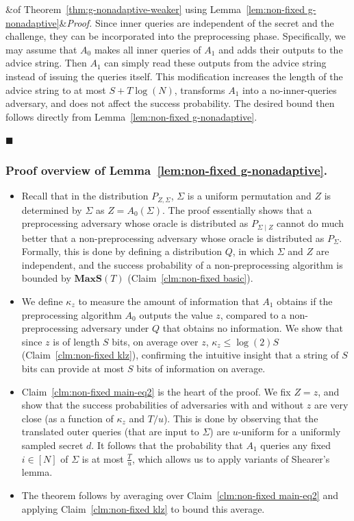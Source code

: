 \documentclass[11pt]{article}
\renewenvironment{proof}[1][]
    {\noindent
       \ifx&#1&{\it Proof.}
       \else{\it Proof ({#1}).}
       \fi}{\hfill $\blacksquare$}
\newcommand{\secv}{{d}}
\newcommand{\MAXS}{\boldsymbol{MaxS}}
\begin{document}
\begin{proof}[of Theorem~\ref{thm:g-nonadaptive-weaker} using Lemma~\ref{lem:non-fixed g-nonadaptive}] Since inner queries are independent of the secret and the challenge, they can be incorporated into the preprocessing phase. Specifically, we may assume that $A_0$ makes all inner queries of $A_1$ and adds their outputs to the advice string. Then $A_1$ can simply read these outputs from the advice string instead of issuing the queries itself. This modification increases the length of the advice string to at most $S + T \log(N)$, transforms $A_1$ into a no-inner-queries adversary, and does not affect the success probability. The desired bound then follows directly from Lemma~\ref{lem:non-fixed g-nonadaptive}.

\end{proof}

\subsubsection{Proof overview of Lemma~\ref{lem:non-fixed g-nonadaptive}.}
\label{subsec:proof overview of weaker}

\begin{itemize}
    \item Recall that in the distribution $P_{Z,\Sigma}$, $\Sigma$ is a uniform permutation and $Z$ is determined by $\Sigma$ as 
    $Z=A_0(\Sigma)$.
    The proof essentially shows that a preprocessing adversary whose oracle is distributed as $P_{\Sigma \mid Z}$ cannot do much better that a non-preprocessing adversary whose oracle is distributed as $P_{\Sigma}$. Formally, this is done by defining a distribution $Q$, in which $\Sigma$ and $Z$ are independent, and the success probability of a non-preprocessing algorithm is bounded by $\MAXS(T)$ (Claim~\ref{clm:non-fixed basic}). 
    \item We define $\kappa_z$ to measure the amount of information that $A_1$ obtains if the preprocessing algorithm $A_0$ outputs the value $z$, compared to a non-preprocessing adversary under $Q$ that obtains no information. We show that since $z$ is of length $S$ bits, on average over $z$, $\kappa_z \leq \log(2)S$ (Claim~\ref{clm:non-fixed klz}), confirming the intuitive insight that a string of $S$ bits can provide at most $S$ bits of information on average.
    \item Claim~\ref{clm:non-fixed main-eq2} is the heart of the proof. We fix $Z=z$, and show that the success probabilities of adversaries with and without $z$ are very close (as a function of $\kappa_z$ and $T/u$). This is done by observing that the translated outer queries (that are input to $\Sigma$) are $u$-uniform for a uniformly sampled secret $\secv$. It follows that the probability that $A_1$ queries any fixed $i \in [N]$ of $\Sigma$ is at most $\tfrac{T}{u}$, which allows us to apply variants of Shearer's lemma.
    \item The theorem follows by averaging over Claim~\ref{clm:non-fixed main-eq2} and applying Claim~\ref{clm:non-fixed klz} to bound this average.
\end{itemize}
\end{document}
